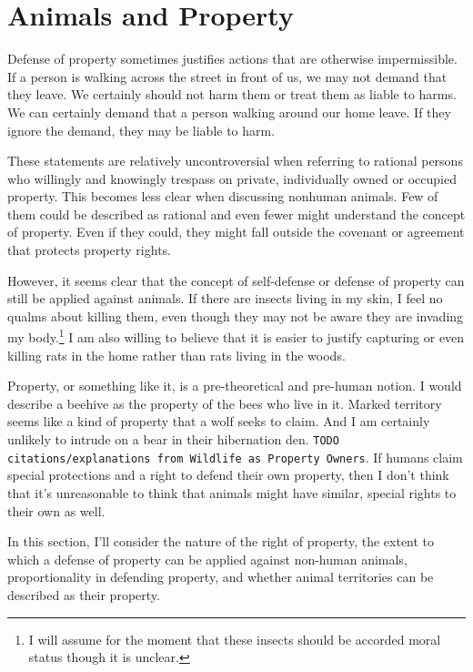 \documentclass[12pt]{article}
\begin{document}
\section{Animals and Property}

	Defense of property sometimes justifies actions that are otherwise
	impermissible. If a person is walking across the street in front of us, we
	may not demand that they leave. We certainly should not harm them or treat
	them as liable to harms.  We can certainly demand that a person walking
	around our home leave. If they ignore the demand, they may be liable to
	harm.

	These statements are relatively uncontroversial when referring to rational
	persons who willingly and knowingly trespass on private, individually owned
	or occupied property. This becomes less clear when discussing nonhuman
	animals. Few of them could be described as rational and even fewer might
	understand the concept of property. Even if they could, they might fall
	outside the covenant or agreement that protects property rights.

	However, it seems clear that the concept of self-defense or defense of
	property can still be applied against animals.  If there are insects living
	in my skin, I feel no qualms about killing them, even though they may not
	be aware they are invading my body.\footnote{I will assume for the moment
	that these insects should be accorded moral status though it is unclear.}
	I am also willing to believe that it is easier to justify capturing or even
	killing rats in the home rather than rats living in the woods.

	Property, or something like it, is a pre-theoretical and pre-human notion.
	I would describe a beehive as the property of the bees who live in it.
	Marked territory seems like a kind of property that a wolf seeks to claim.
	And I am certainly unlikely to intrude on a bear in their hibernation den.
	\texttt{TODO citations/explanations from Wildlife as Property Owners}.  If
	humans claim special protections and a right to defend their own property,
	then I don’t think that it’s unreasonable to think that animals might have
	similar, special rights to their own as well.

	In this section, I’ll consider the nature of the right of property, the
	extent to which a defense of property can be applied against non-human
	animals, proportionality in defending property, and whether animal
	territories can be described as their property.
\end{document}
